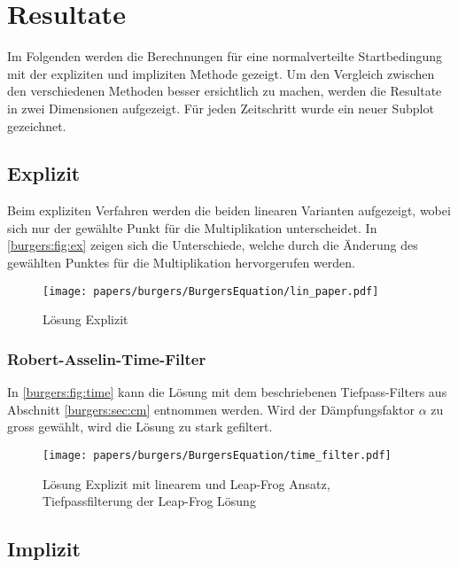 %
%
\section{Resultate
\label{burgers:section:results}}

	Im Folgenden werden die Berechnungen f\"ur eine normalverteilte Startbedingung mit der expliziten und impliziten Methode gezeigt.
	Um den Vergleich zwischen den verschiedenen Methoden besser ersichtlich zu machen, werden die Resultate in zwei Dimensionen aufgezeigt.
	F\"ur jeden Zeitschritt wurde ein neuer Subplot gezeichnet.

	\subsection{Explizit}

	Beim expliziten Verfahren werden die beiden linearen Varianten aufgezeigt,
	wobei sich nur der gew\"ahlte Punkt f\"ur die Multiplikation unterscheidet.
	In \autoref{burgers:fig:ex} zeigen sich die Unterschiede, welche durch die \"Anderung des gewählten Punktes für die Multiplikation hervorgerufen werden.


    \begin{figure}
	\centering
	\texttt{[image: papers/burgers/BurgersEquation/lin\_paper.pdf]}
	\caption{L\"osung Explizit}
	\label{burgers:fig:ex}
	\end{figure}

	\subsubsection{Robert-Asselin-Time-Filter}
	In \autoref{burgers:fig:time} kann die L\"osung mit dem beschriebenen Tiefpass-Filters aus Abschnitt \ref{burgers:sec:cm} entnommen werden.
	Wird der D\"ampfungsfaktor $\alpha$ zu gross gew\"ahlt, wird die L\"osung zu stark gefiltert.

	  \begin{figure}
		\centering
		\texttt{[image: papers/burgers/BurgersEquation/time\_filter.pdf]}
		\caption{L\"osung Explizit mit linearem und Leap-Frog Ansatz, Tiefpassfilterung der Leap-Frog L\"osung }
		\label{burgers:fig:time}
		\end{figure}


	\subsection{Implizit}

